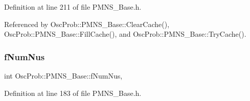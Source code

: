 Definition at line 211 of file P\+M\+N\+S\+\_\+\+Base.\+h.



Referenced by Osc\+Prob\+::\+P\+M\+N\+S\+\_\+\+Base\+::\+Clear\+Cache(), Osc\+Prob\+::\+P\+M\+N\+S\+\_\+\+Base\+::\+Fill\+Cache(), and Osc\+Prob\+::\+P\+M\+N\+S\+\_\+\+Base\+::\+Try\+Cache().

\mbox{\label{classOscProb_1_1PMNS__Base_a24bb74bed63569dfe88b18fa6a08060e}} 
\subsubsection{\texorpdfstring{f\+Num\+Nus}{fNumNus}}
{\footnotesize\ttfamily int Osc\+Prob\+::\+P\+M\+N\+S\+\_\+\+Base\+::f\+Num\+Nus\hspace{0.3cm}{\ttfamily [protected]}, {\ttfamily [inherited]}}



Definition at line 183 of file P\+M\+N\+S\+\_\+\+Base.\+h.



